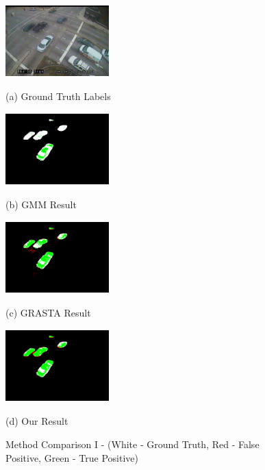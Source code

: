 \documentclass{article}
\begin{document}
\begin{figure}[t]
\centering
\begin{minipage}[b]{0.48\linewidth}
  \centering
  \centerline{\includegraphics[width=4cm, height=2.8cm]{Imgs/0112051333.jpg}}
  \centerline{(a) Ground Truth Labels}\medskip
\end{minipage}
\begin{minipage}[b]{0.48\linewidth}
  \centering
  \centerline{\includegraphics[width=4cm, height=2.8cm]{Imgs/0112051333_gmm_rwg.png}}
  \centerline{(b) GMM Result}\medskip
\end{minipage}

\begin{minipage}[b]{0.48\linewidth}
  \centering
  \centerline{\includegraphics[width=4cm, height =2.8cm]{Imgs/0112051333_grasta_rwg.png}}
  \centerline{(c) GRASTA Result}\medskip
\end{minipage}
\begin{minipage}[b]{0.48\linewidth}
  \centering
  \centerline{\includegraphics[width=4cm, height = 2.8cm]{Imgs/0112051333_rpca_rwg.png}}
  \centerline{(d) Our Result}\medskip
\end{minipage}

\caption{Method Comparison I - (White - Ground Truth, Red - False Positive, Green -  True Positive)}
\label{fig:methodComp1}
%
\end{figure}
\end{document}
